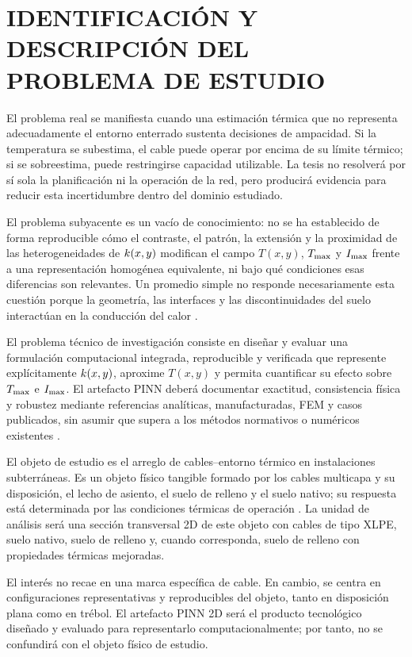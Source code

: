 \section{IDENTIFICACIÓN Y DESCRIPCIÓN DEL PROBLEMA DE ESTUDIO}
\label{sec:planteamiento-problema}

El problema real se manifiesta cuando una estimación térmica que no representa adecuadamente el entorno enterrado sustenta decisiones de ampacidad. Si la temperatura se subestima, el cable puede operar por encima de su límite térmico; si se sobreestima, puede restringirse capacidad utilizable. La tesis no resolverá por sí sola la planificación ni la operación de la red, pero producirá evidencia para reducir esta incertidumbre dentro del dominio estudiado.

El problema subyacente es un vacío de conocimiento: no se ha establecido de forma reproducible cómo el contraste, el patrón, la extensión y la proximidad de las heterogeneidades de $k(x,y)$ modifican el campo $T(x,y)$, $T_{\max}$ y $I_{\max}$ frente a una representación homogénea equivalente, ni bajo qué condiciones esas diferencias son relevantes. Un promedio simple no responde necesariamente esta cuestión porque la geometría, las interfaces y las discontinuidades del suelo interactúan en la conducción del calor \parencites[4--6]{enescu2021}[3--4,93--99]{cigre2025}.

El problema técnico de investigación consiste en diseñar y evaluar una formulación computacional integrada, reproducible y verificada que represente explícitamente $k(x,y)$, aproxime $T(x,y)$ y permita cuantificar su efecto sobre $T_{\max}$ e $I_{\max}$. El artefacto PINN deberá documentar exactitud, consistencia física y robustez mediante referencias analíticas, manufacturadas, FEM y casos publicados, sin asumir que supera a los métodos normativos o numéricos existentes \parencites{iec60287}{iec60853}[3--4,93--99]{cigre2025}[686--690]{raissi2019}.

El objeto de estudio es el arreglo de cables--entorno térmico en instalaciones subterráneas. Es un objeto físico tangible formado por los cables multicapa y su disposición, el lecho de asiento, el suelo de relleno y el suelo nativo; su respuesta está determinada por las condiciones térmicas de operación \parencites[3--6]{enescu2021}{ieee442}[1,10]{kim2025}. La unidad de análisis será una sección transversal 2D de este objeto con cables de tipo XLPE, suelo nativo, suelo de relleno y, cuando corresponda, suelo de relleno con propiedades térmicas mejoradas.

El interés no recae en una marca específica de cable. En cambio, se centra en configuraciones representativas y reproducibles del objeto, tanto en disposición plana como en trébol. El artefacto PINN 2D será el producto tecnológico diseñado y evaluado para representarlo computacionalmente; por tanto, no se confundirá con el objeto físico de estudio.

